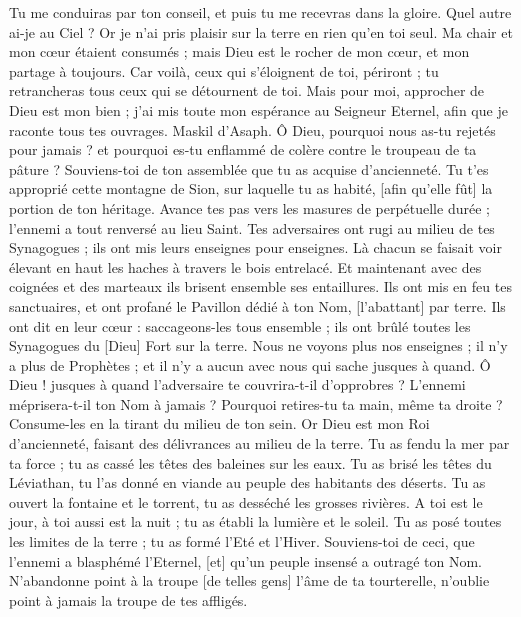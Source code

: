 \begin{multicols}{2}
Tu me conduiras par ton conseil, et puis tu me recevras dans la gloire.
Quel autre ai-je au Ciel ? Or je n'ai pris plaisir sur la terre en rien qu'en toi seul.
Ma chair et mon cœur étaient consumés ; mais Dieu est le rocher de mon cœur, et mon partage à toujours.
Car voilà, ceux qui s'éloignent de toi, périront ; tu retrancheras tous ceux qui se détournent de toi.
Mais pour moi, approcher de Dieu est mon bien ; j'ai mis toute mon espérance au Seigneur Eternel, afin que je raconte tous tes ouvrages.
\VerseOne{}Maskil d'Asaph. Ô Dieu, pourquoi nous as-tu rejetés pour jamais ? et pourquoi es-tu enflammé de colère contre le troupeau de ta pâture ?
Souviens-toi de ton assemblée que tu as acquise d'ancienneté. Tu t'es approprié cette montagne de Sion, sur laquelle tu as habité, [afin qu'elle fût] la portion de ton héritage.
Avance tes pas vers les masures de perpétuelle durée ; l'ennemi a tout renversé au lieu Saint.
Tes adversaires ont rugi au milieu de tes Synagogues ; ils ont mis leurs enseignes pour enseignes.
Là chacun se faisait voir élevant en haut les haches à travers le bois entrelacé.
Et maintenant avec des coignées et des marteaux ils brisent ensemble ses entaillures.
Ils ont mis en feu tes sanctuaires, et ont profané le Pavillon dédié à ton Nom, [l'abattant] par terre.
Ils ont dit en leur cœur : saccageons-les tous ensemble ; ils ont brûlé toutes les Synagogues du [Dieu] Fort sur la terre.
Nous ne voyons plus nos enseignes ; il n'y a plus de Prophètes ; et il n'y a aucun avec nous qui sache jusques à quand.
Ô Dieu ! jusques à quand l'adversaire te couvrira-t-il d'opprobres ? L'ennemi méprisera-t-il ton Nom à jamais ?
Pourquoi retires-tu ta main, même ta droite ? Consume-les en la tirant du milieu de ton sein.
Or Dieu est mon Roi d'ancienneté, faisant des délivrances au milieu de la terre.
Tu as fendu la mer par ta force ; tu as cassé les têtes des baleines sur les eaux.
Tu as brisé les têtes du Léviathan, tu l'as donné en viande au peuple des habitants des déserts.
Tu as ouvert la fontaine et le torrent, tu as desséché les grosses rivières.
A toi est le jour, à toi aussi est la nuit ; tu as établi la lumière et le soleil.
Tu as posé toutes les limites de la terre ; tu as formé l'Eté et l'Hiver.
Souviens-toi de ceci, que l'ennemi a blasphémé l'Eternel, [et] qu'un peuple insensé a outragé ton Nom.
N'abandonne point à la troupe [de telles gens] l'âme de ta tourterelle, n'oublie point à jamais la troupe de tes affligés.

\end{multicols}

